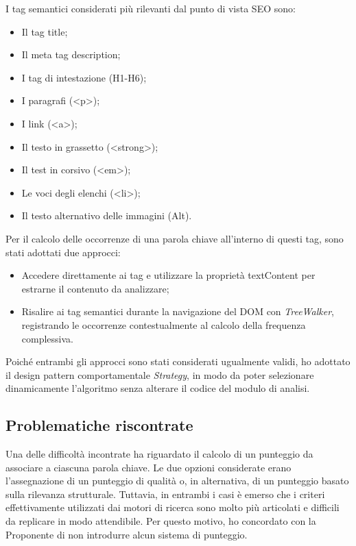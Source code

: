 \vspace{10pt}
\par\noindent I tag semantici considerati più rilevanti dal punto di vista SEO sono:
\begin{itemize}
  \item Il tag title;
  \item Il meta tag description;
  \item I tag di intestazione (H1-H6);
  \item I paragrafi (<p>);
  \item I link (<a>);
  \item Il testo in grassetto (<strong>);
  \item Il test in corsivo (<em>);
  \item Le voci degli elenchi (<li>);
  \item Il testo alternativo delle immagini (Alt).
\end{itemize}

\vspace{10pt}
\par\noindent Per il calcolo delle occorrenze di una parola chiave all’interno di questi tag, sono stati adottati due approcci:
\begin{itemize}
  \item Accedere direttamente ai tag e utilizzare la proprietà textContent per estrarne il contenuto da analizzare;
  \item Risalire ai tag semantici durante la navigazione del DOM con \textit{TreeWalker}, registrando le occorrenze contestualmente al calcolo della frequenza complessiva.
\end{itemize}

\vspace{10pt}
\par\noindent Poiché entrambi gli approcci sono stati considerati ugualmente validi, ho adottato il design pattern comportamentale \textit{Strategy}, in modo da poter selezionare dinamicamente l’algoritmo senza alterare il codice del modulo di analisi.

\subsection{Problematiche riscontrate}

\par Una delle difficoltà incontrate ha riguardato il calcolo di un punteggio da associare a ciascuna parola chiave. Le due opzioni considerate erano l’assegnazione di un punteggio di qualità o, in alternativa, di un punteggio basato sulla rilevanza strutturale. Tuttavia, in entrambi i casi è emerso che i criteri effettivamente utilizzati dai motori di ricerca sono molto più articolati e difficili da replicare in modo attendibile. Per questo motivo, ho concordato con la Proponente di non introdurre alcun sistema di punteggio.

